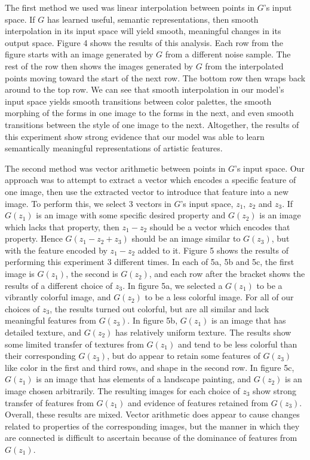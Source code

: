 \documentclass[10pt,twocolumn,letterpaper]{article}
\begin{document}
The first method we used was linear interpolation between points in $ G $'s input space. If $ G $ has learned useful, semantic representations, then smooth interpolation in its input space will yield smooth, meaningful changes in its output space. Figure 4 shows the results of this analysis. Each row from the figure starts with an image generated by $ G $ from a different noise sample. The rest of the row then shows the images generated by $ G $ from the interpolated points moving toward the start of the next row. The bottom row then wraps back around to the top row. We can see that smooth interpolation in our model's input space yields smooth transitions between color palettes, the smooth morphing of the forms in one image to the forms in the next, and even smooth transitions between the style of one image to the next. Altogether, the results of this experiment show strong evidence that our model was able to learn semantically meaningful representations of artistic features.

The second method was vector arithmetic between points in $ G $'s input space. Our approach was to attempt to extract a vector which encodes a specific feature of one image, then use the extracted vector to introduce that feature into a new image. To perform this, we select 3 vectors in $ G $'s input space, $ z_1 $, $ z_2 $ and $ z_3 $. If $ G(z_1) $ is an image with some specific desired property and $ G(z_2) $ is an image which lacks that property, then $ z_1 - z_2 $ should be a vector which encodes that property. Hence $ G(z_1 - z_2 + z_3) $ should be an image similar to $ G(z_3) $, but with the feature encoded by $ z_1 - z_2 $ added to it. Figure 5 shows the results of performing this experiment 3 different times. In each of 5a, 5b and 5c, the first image is $ G(z_1) $, the second is $ G(z_2) $, and each row after the bracket shows the results of a different choice of $ z_3 $. In figure 5a, we selected a $ G(z_1) $ to be a vibrantly colorful image, and $ G(z_2) $ to be a less colorful image. For all of our choices of $ z_3 $, the results turned out colorful, but are all similar and lack meaningful features from $ G(z_3) $. In figure 5b, $ G(z_1) $ is an image that has detailed texture, and $ G(z_2) $ has relatively uniform texture. The results show some limited transfer of textures from $ G(z_1) $ and tend to be less colorful than their corresponding $ G(z_3) $, but do appear to retain some features of $ G(z_3) $ like color in the first and third rows, and shape in the second row. In figure 5c, $ G(z_1) $ is an image that has elements of a landscape painting, and $ G(z_2) $ is an image chosen arbitrarily. The resulting images for each choice of $ z_3 $ show strong transfer of features from $ G(z_1) $ and evidence of features retained from $ G(z_3) $. Overall, these results are mixed. Vector arithmetic does appear to cause changes related to properties of the corresponding images, but the manner in which they are connected is difficult to ascertain because of the dominance of features from $ G(z_1) $.
\end{document}

